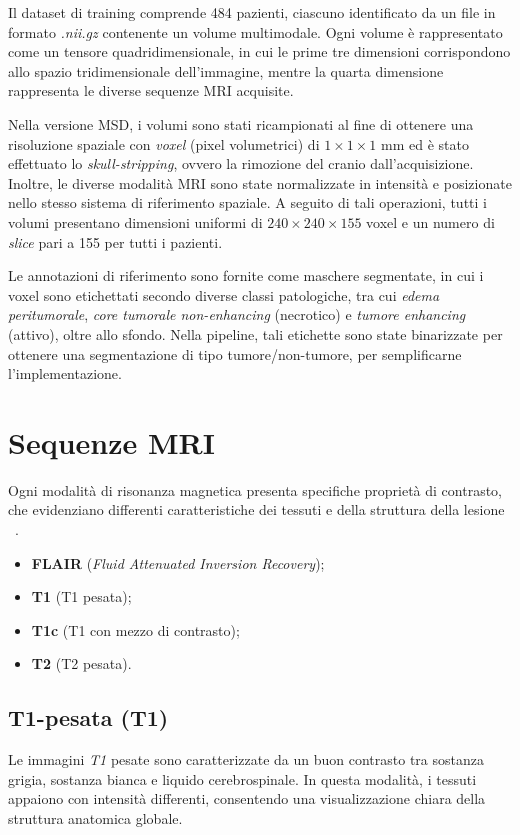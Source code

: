 Il dataset di training comprende 484 pazienti, ciascuno identificato da un file in formato \textit{.nii.gz} contenente un volume multimodale. Ogni volume è rappresentato come un tensore quadridimensionale, in cui le prime tre dimensioni corrispondono allo spazio tridimensionale dell'immagine, mentre la quarta dimensione rappresenta le diverse sequenze MRI acquisite.

Nella versione MSD, i volumi sono stati ricampionati al fine di ottenere una risoluzione spaziale con \textit{voxel} (pixel volumetrici) di $1 \times 1 \times 1$ mm ed è stato effettuato lo \textit{skull-stripping}, ovvero la rimozione del cranio dall'acquisizione. Inoltre, le diverse modalità MRI sono state normalizzate in intensità e posizionate nello stesso sistema di riferimento spaziale. A seguito di tali operazioni, tutti i volumi presentano dimensioni uniformi di $240 \times 240 \times 155$ voxel e un numero di \textit{slice} pari a 155 per tutti i pazienti.

Le annotazioni di riferimento sono fornite come maschere segmentate, in cui i voxel sono etichettati secondo diverse classi patologiche, tra cui \textit{edema peritumorale}, \textit{core tumorale non-enhancing} (necrotico) e \textit{tumore enhancing} (attivo), oltre allo sfondo. Nella pipeline, tali etichette sono state binarizzate per ottenere una segmentazione di tipo tumore/non-tumore, per semplificarne l'implementazione.

\section{Sequenze MRI}
Ogni modalità di risonanza magnetica presenta specifiche proprietà di contrasto, che evidenziano differenti caratteristiche dei tessuti e della struttura della lesione ~\cite{menze2015}.

\begin{itemize}
    \item \textbf{FLAIR} (\textit{Fluid Attenuated Inversion Recovery});
    \item \textbf{T1} (T1 pesata);
    \item \textbf{T1c} (T1 con mezzo di contrasto);
    \item \textbf{T2} (T2 pesata).
\end{itemize}

\subsection{T1-pesata (T1)}
Le immagini \textit{T1} pesate sono caratterizzate da un buon contrasto tra sostanza grigia, sostanza bianca e liquido cerebrospinale. In questa modalità, i tessuti appaiono con intensità differenti, consentendo una visualizzazione chiara della struttura anatomica globale.

